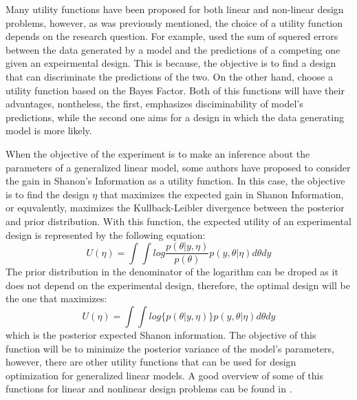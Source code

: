\documentclass[preprint,review,12pt]{elsarticle}
\begin{document}
Many utility functions have been proposed for both linear and non-linear design problems, however, as was previously mentioned, the choice of a utility function depends on the research question. For example, \cite{Myung2009} used the sum of squered errors between the data generated by a model and the predictions of a competing one given an expeirmental design. This is because, the objective is to find a design that can discriminate the predictions of the two. On the other hand, \cite{ZL2010} choose a utility function based on the Bayes Factor. Both of this functions will have their advantages, nontheless, the first, emphasizes disciminability of model's predictions, while the second one aims for a design in which the data generating model is more likely.

When the objective of the experiment is to make an inference about the parameters of a generalized linear model, some authors \citep[e.g.][]{Ber1979} have proposed to consider the gain in Shanon's Information as a utility function. In this case, the objective is to find the design $\eta$ that maximizes the expected gain in Shanon Information, or equvalently, maximizes the Kullback-Leibler divergence between the posterior and prior distribution. With this function, the expected utility of an experimental design is represented by the following equation:
\begin{equation}
U(\eta)=\int \int log\frac{p(\theta|y,\eta)}{p(\theta)} p(y,\theta |\eta) d\theta dy
\label{klu}
\end{equation}
The prior distribution in the denominator of the logarithm can be droped as it does not depend on the experimental design, therefore, the optimal design will be the one that maximizes:
\begin{equation}
U(\eta)=\int \int log \{p(\theta|y,\eta)\} p(y,\theta |\eta) d\theta dy
\label{egShanon}
\end{equation}
which is the posterior expected Shanon information. The objective of this function will be to minimize the posterior variance of the model's parameters, however, there are other utility functions that can be used for design optimization for generalized linear models. A good overview of some of this functions for linear and nonlinear design problems can be found in \citet{ChalonerVerdinelli1995}. 
\end{document}
